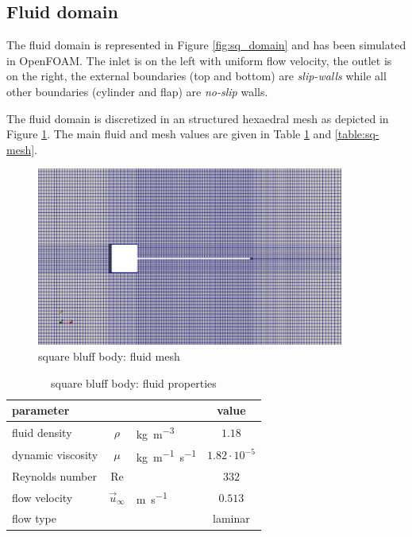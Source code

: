 \subsection{Fluid domain}

The fluid domain is represented in Figure \ref{fig:sq_domain} and has been simulated in OpenFOAM. The inlet is on the left with uniform flow velocity, the outlet is on the right, the external boundaries (top and bottom) are \textit{slip-walls} while all other boundaries (cylinder and flap) are \textit{no-slip} walls.


The fluid domain is discretized in an structured hexaedral mesh as depicted in Figure \ref{fig:sq_mesh}. The main fluid and mesh values are given in Table \ref{table:sq-fluid} and \ref{table:sq-mesh}. 

\begin{figure}[htbp!]
	\centering
	\includegraphics[width=0.9\textwidth]{images/sq-cyl/sq_mesh.png}
	\caption{square bluff body: fluid mesh}
	\label{fig:sq_mesh}
\end{figure}


\begin{table}[!htb]
	\begin{center}
		\begin{tabular}{ l c l | c } 
			parameter & & & value  \\ 
			\hline
			fluid density  & $\rho$ & \si{kg.m^{-3}} & $1.18$   \\
			dynamic viscosity & $\mu$& \si{kg.m^{-1}.s^{-1}} & $1.82 \cdot 10^{-5}$  \\
			Reynolds number & Re &  & $332$ \\
			flow velocity & $\vec{u}_{\infty}$ & \si{m.s^{-1}} & $0.513$ \\
			flow type & & & laminar \\
		\end{tabular}
	\end{center}
	\caption{square bluff body: fluid properties}
	\label{table:sq-fluid}
\end{table}



